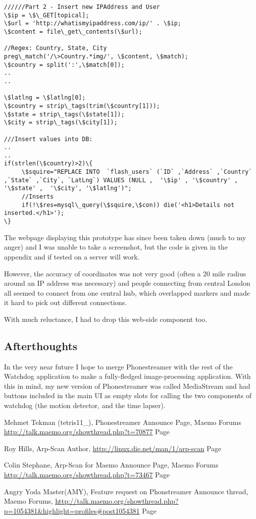 \begin{lstlisting}[title=\bf Snippet from insert.php]
//////Part 2 - Insert new IPAddress and User
\$ip = \$\_GET[topical];
\$url = 'http://whatismyipaddress.com/ip/' . \$ip;
\$content = file\_get\_contents(\$url);

//Regex: Country, State, City
preg\_match('/\>Country.*img/', \$content, \$match); 
\$country = split(':',\$match[0]);
..
..

\$latlng = \$latlng[0];
\$country = strip\_tags(trim(\$country[1]));
\$state = strip\_tags(\$state[1]);
\$city = strip\_tags(\$city[1]);

///Insert values into DB:
..
..
if(strlen(\$country)>2)\{
     \$squire="REPLACE INTO  `flash_users` (`ID` ,`Address` ,`Country` ,`State` ,`City`, `LatLng`) VALUES (NULL ,  '\$ip' , '\$country' , '\$state' ,  '\$city', '\$latlng')";
     //Inserts
     if(!\$res=mysql\_query(\$squire,\$con)) die('<h1>Details not inserted.</h1>');
\}
\end{lstlisting}

The webpage displaying this prototype has since been taken down (much to my anger) and I was unable to take a screenshot, but the code is given in the appendix and if tested on a server will work.

However, the accuracy of coordinates was not very good (often a 20 mile radius around an IP address was necessary) and people connecting from central London all seemed to connect from one central hub, which overlapped markers and made it hard to pick out different connections.

With much reluctance, I had to drop this web-side component too.

\subsection{Afterthoughts}
In the very near future I hope to merge Phonestreamer with the rest of the Watchdog application to make a fully-fledged image-processing application. With this in mind, my new version of Phonestreamer was called MediaStream and had buttons included in the main UI as empty slots for calling the two components of watchdog (the motion detector, and the time lapser).

\begin{thebibliography}{9}

Mehmet Tekman (tetris11\_), Phonestreamer Announce Page, Maemo Forums
\url{http://talk.maemo.org/showthread.php?t=70877}
Page~\pageref{ref:phonstreamer}

Roy Hills, Arp-Scan Author, \url{http://linux.die.net/man/1/arp-scan}
Page~\pageref{ref:arpscanman}

Colin Stephane, Arp-Scan for Maemo Announce Page, Maemo Forums
\url{http://talk.maemo.org/showthread.php?t=73467}
Page~\pageref{ref:arpscanmaemo}

Angry Yoda Master(AMY), Feature request on Phonstreamer Announce thread, Maemo Forums,
\url{http://talk.maemo.org/showthread.php?p=1054381\&highlight=profiles\#post1054381}
Page~\pageref{ref:amy}

\end{thebibliography}

%
%